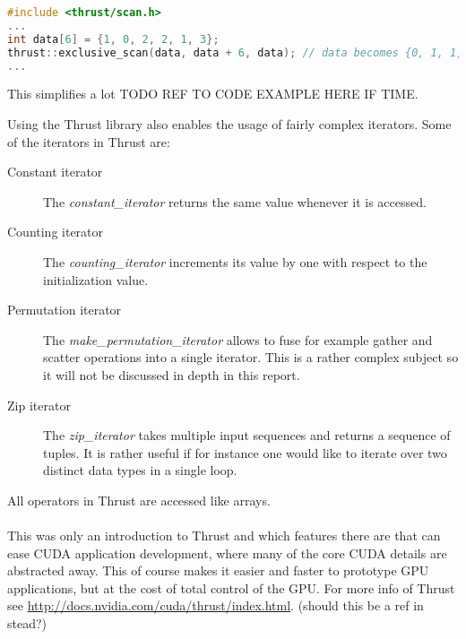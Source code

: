 \begin{lstlisting}[language=C,caption={Exclusive scan in Thrust},label=lst:thrust-scan]
#include <thrust/scan.h> 
...
int data[6] = {1, 0, 2, 2, 1, 3}; 
thrust::exclusive_scan(data, data + 6, data); // data becomes {0, 1, 1, 3, 5, 6}
...
\end{lstlisting}
This simplifies a lot TODO REF TO CODE EXAMPLE HERE IF TIME.

Using the Thrust library also enables the usage of fairly complex iterators.
Some of the iterators in Thrust are:
\begin{description}
	\item[Constant iterator] The \textit{constant\_iterator} returns the same value whenever it is accessed.
	\item[Counting iterator] The \textit{counting\_iterator} increments its value by one with respect to the initialization value.
	\item[Permutation iterator] The \textit{make\_permutation\_iterator} allows to fuse for example gather and scatter operations into a single iterator. This is a rather complex subject so it will not be discussed in depth in this report.
	\item[Zip iterator] The \textit{zip\_iterator} takes multiple input sequences and returns a sequence of tuples. It is rather useful if for instance one would like to iterate over two distinct data types in a single loop.
\end{description}
All operators in Thrust are accessed like arrays.
\\\\
This was only an introduction to Thrust and which features there are that can ease CUDA application development, where many of the core CUDA details are abstracted away.
This of course makes it easier and faster to prototype GPU applications, but at the cost of total control of the GPU.
For more info of Thrust see \url{http://docs.nvidia.com/cuda/thrust/index.html}. (should this be a ref in stead?)